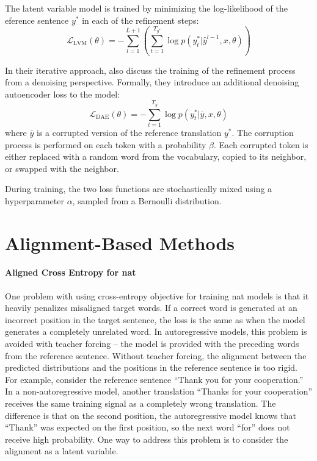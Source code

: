 The latent variable model is trained by minimizing the log-likelihood of the
eference sentence $y^*$ in each of the refinement steps:
\begin{equation}
  \mathcal{L}_{\text{LVM}}(\theta) = - \sum_{l=1}^{L+1} \left(
    \sum_{t=1}^{T_{y^*}} \log p(y_t^* | \hat{y}^{l-1}, x, \theta)
  \right) \label{eq:refinement-lvm-loss}
\end{equation}

In their iterative approach, \citet{lee-etal-2018-deterministic} also discuss
the training of the refinement process from a denoising perspective. Formally,
they introduce an additional denoising autoencoder loss to the model:
%
\begin{equation}
  \mathcal{L}_{\text{DAE}}(\theta) = - \sum_{t=1}^{T_y} \log p(y_t^* | \bar{y}, x, \theta)
\end{equation}
where $\bar{y}$ is a corrupted version of the reference translation $y^*$. The
corruption process is performed on each token with a probability $\beta$. Each
corrupted token is either replaced with a random word from the vocabulary,
copied to its neighbor, or swapped with the neighbor.

During training, the two loss functions are stochastically mixed using a
hyperparameter $\alpha$, sampled from a Bernoulli distribution.

\section{Alignment-Based Methods}%
\label{sec:nat:alignment}

\paragraph{Aligned Cross Entropy for \ac{nat}} One problem with using
cross-entropy objective for training \ac{nat} models is that it heavily
penalizes misaligned target words. If a correct word is generated at an
incorrect position in the target sentence, the loss is the same as when the
model generates a completely unrelated word. In autoregressive models, this
problem is avoided with teacher forcing -- the model is provided with the
preceding words from the reference sentence. Without teacher forcing, the
alignment between the predicted distributions and the positions in the
reference sentence is too rigid. For example, consider the reference sentence
``Thank you for your cooperation.'' In a non-autoregressive model, another
translation ``Thanks for your cooperation'' receives the same training signal
as a completely wrong translation. The difference is that on the second
position, the autoregressive model knows that ``Thank'' was expected on the
first position, so the next word ``for'' does not receive high probability.
One way to address this problem is to consider the alignment as a latent
variable.

